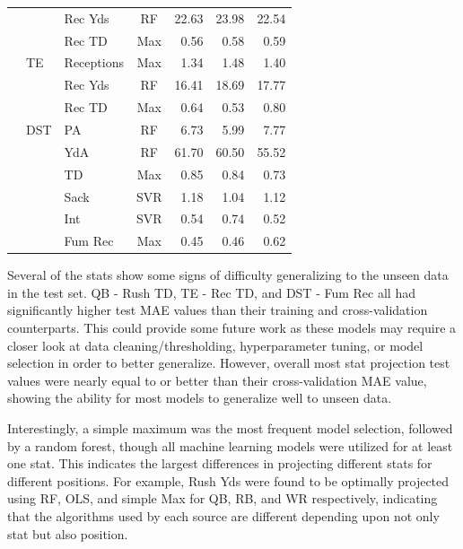 \documentclass[12pt]{article}
\begin{document}
\begin{table}[H]
\begin{tabular}{lllcrrr}
{} &       {} &     Rec Yds &                  RF &  22.63 &  23.98 &  22.54 \\
{} &       {} &      Rec TD &                 Max &   0.56 &   0.58 &   0.59 \\
\midrule
{} &       TE &  Receptions &                 Max &   1.34 &   1.48 &   1.40 \\
{} &       {} &     Rec Yds &                  RF &  16.41 &  18.69 &  17.77 \\
{} &       {} &      Rec TD &                 Max &   0.64 &   0.53 &   0.80 \\
\midrule
{} &      DST &          PA &                  RF &   6.73 &   5.99 &   7.77 \\
{} &       {} &         YdA &                  RF &  61.70 &  60.50 &  55.52 \\
{} &       {} &          TD &                 Max &   0.85 &   0.84 &   0.73 \\
{} &       {} &        Sack &                 SVR &   1.18 &   1.04 &   1.12 \\
{} &       {} &         Int &                 SVR &   0.54 &   0.74 &   0.52 \\
{} &       {} &     Fum Rec &                 Max &   0.45 &   0.46 &   0.62 \\
\bottomrule
\end{tabular}
\end{table}

Several of the stats show some signs of difficulty generalizing to the unseen data in the test set. QB - Rush TD, TE - Rec TD, and DST - Fum Rec all had significantly higher test MAE values than their training and cross-validation counterparts. This could provide some future work as these models may require a closer look at data cleaning/thresholding, hyperparameter tuning, or model selection in order to better generalize. However, overall most stat projection test values were nearly equal to or better than their cross-validation MAE value, showing the ability for most models to generalize well to unseen data.\bigskip

Interestingly, a simple maximum was the most frequent model selection, followed by a random forest, though all machine learning models were utilized for at least one stat. This indicates the largest differences in projecting different stats for different positions. For example, Rush Yds were found to be optimally projected using RF, OLS, and simple Max for QB, RB, and WR respectively, indicating that the algorithms used by each source are different depending upon not only stat but also position.\bigskip
\end{document}
